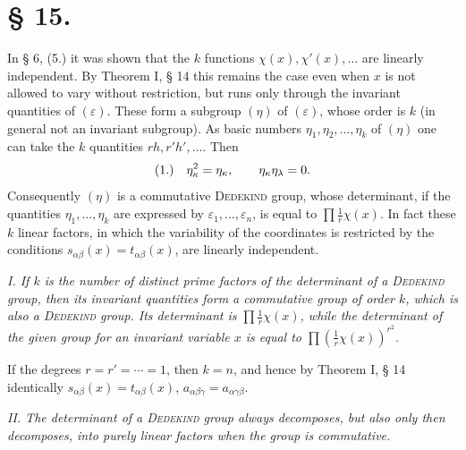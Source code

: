 \documentclass[11pt]{article}
\newcommand{\eps}{\varepsilon}
\newcommand{\fnum}[1]{\textup{(\ensuremath{#1}.)}\quad}
\begin{document}
\section*{§ 15.}

In § 6, (5.) it was shown that the $k$ functions $\chi(x),\chi'(x),\ldots$ are linearly independent. By Theorem I, § 14 this remains the case even when $x$ is not allowed to vary without restriction, but runs only through the invariant quantities of $(\eps)$. These form a subgroup $(\eta)$ of $(\eps)$, whose order is $k$ (in general not an invariant subgroup). As basic numbers $\eta_1,\eta_2,\ldots,\eta_k$ of $(\eta)$ one can take the $k$ quantities $rh,r'h',\ldots$. Then
\[
\fnum{1} \eta_\kappa^2=\eta_\kappa,
\qquad \eta_\kappa\eta_\lambda=0.
\]
Consequently $(\eta)$ is a commutative \textsc{Dedekind} group, whose determinant, if the quantities $\eta_1,\ldots,\eta_k$ are expressed by $\eps_1,\ldots,\eps_n$, is equal to $\prod \frac1r\chi(x)$. In fact these $k$ linear factors, in which the variability of the coordinates is restricted by the conditions $s_{\alpha\beta}(x)=t_{\alpha\beta}(x)$, are linearly independent.

\emph{I. If $k$ is the number of distinct prime factors of the determinant of a \textsc{Dedekind} group, then its invariant quantities form a commutative group of order $k$, which is also a \textsc{Dedekind} group. Its determinant is $\prod\frac1r\chi(x)$, while the determinant of the given group for an invariant variable $x$ is equal to $\prod\left(\frac1r\chi(x)\right)^{r^2}$.}

If the degrees $r=r'=\cdots=1$, then $k=n$, and hence by Theorem I, § 14 identically $s_{\alpha\beta}(x)=t_{\alpha\beta}(x)$, $a_{\alpha\beta\gamma}=a_{\alpha\gamma\beta}$.

\emph{II. The determinant of a \textsc{Dedekind} group always decomposes, but also only then decomposes, into purely linear factors when the group is commutative.}
\end{document}
